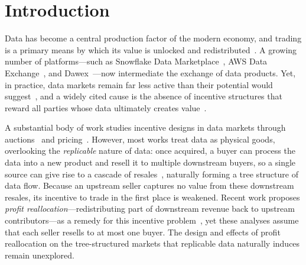 \section{Introduction}
\label{sec:intro}

Data has become a central production factor of the modern economy, and trading is a primary means by which its value is unlocked and redistributed~\citep{analytics2016age,richter2019data}. 
A growing number of platforms---such as Snowflake Data Marketplace~\citep{SnowflakeDocs_MarketplaceAbout}, AWS Data Exchange~\citep{AWSDocs_DataExchangeLanding}, and Dawex~\citep{Dawex_Web_DataMarketplaceModel}---now intermediate the exchange of data products. 
Yet, in practice, data markets remain far less active than their potential would suggest~\citep{Koutroumpis2017UnfulfilledPotential,OECD2021ValueOfData,EuropeanParliament2023DataActPressRelease}, and a widely cited cause is the absence of incentive structures that reward all parties whose data ultimately creates value~\citep{OECD_EASD_2019,azcoitia2022survey,bauer2024designing}.

A substantial body of work studies incentive designs in data markets through auctions~\citep{ghosh2011selling,zhang2020selling,agarwal2024towards} and pricing~\citep{chen2019towards,mi2025multi}.
However, most works treat data as physical goods, overlooking the \emph{replicable} nature of data:
once acquired, a buyer can process the data into a new product and resell it to multiple downstream buyers, so a single source can give rise to a cascade of resales~\citep{JonesTonetti2020NonrivalryData,shiller2013digital,biswas2021incentive}, naturally forming a tree structure of data flow. 
Because an upstream seller captures no value from these downstream resales, its incentive to trade in the first place is weakened.
Recent work proposes \emph{profit reallocation}---redistributing part of downstream revenue back to upstream contributors---as a remedy for this incentive problem~\citep{xin2025tbds,ma2026incentivizing}, yet these analyses assume that each seller resells to at most one buyer.
The design and effects of profit reallocation on the tree-structured markets that replicable data naturally induces remain unexplored.


